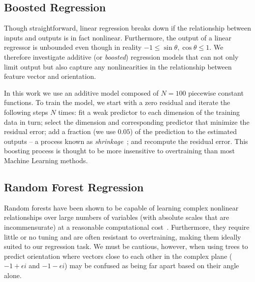 %


\subsection{Boosted Regression}
\label{s:learning_boosted}
Though straightforward, linear regression breaks down if the relationship between inputs and outputs is in fact nonlinear. Furthermore, the output of a linear regressor is unbounded even though in reality $-1 \leq \sin\theta,\cos\theta \leq 1$. We therefore investigate additive (or \emph{boosted}) regression models that can not only limit output but also capture any nonlinearities in the relationship between feature vector and orientation.

In this work we use an additive model composed of $N=100$ piecewise constant functions. To train the model, we start with a zero residual and iterate the following steps $N$ times: fit a weak predictor to each dimension of the training data in turn; select the dimension and corresponding predictor that minimize the residual error; add a fraction (we use $0.05$) of the prediction to the estimated outputs -- a process known as \emph{shrinkage}~\cite{Friedman_AoS01}; and recompute the residual error. This boosting process is thought to be more insensitive to overtraining than most Machine Learning methods.


\subsection{Random Forest Regression}
\label{s:learning_forest}
Random forests have been shown to be capable of learning complex nonlinear relationships over large numbers of variables (with absolute scales that are incommensurate) at a reasonable computational cost~\cite{Breiman_ML01}. Furthermore, they require little or no tuning and are often resistant to overtraining, making them ideally suited to our regression task. We must be cautious, however, when using trees to predict orientation where vectors close to each other in the complex plane (\eg~$-1+\epsilon i$ and $-1-\epsilon i$) may be confused as being far apart based on their angle alone.

